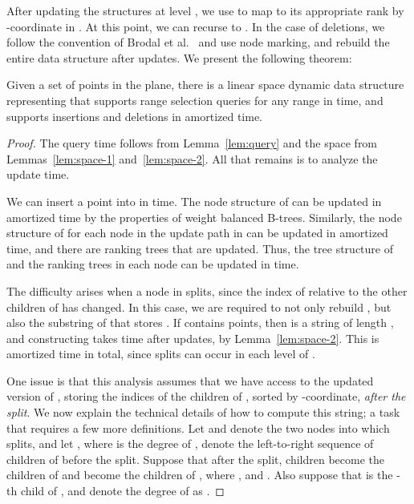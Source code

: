 \documentclass{llncs}
\begin{document}
After updating the structures at level , we use  to map
 to its appropriate rank by -coordinate in .  At this
point, we can recurse to .  In the case of deletions, we follow
the convention of Brodal et al.~\cite{BGJS10} and use node marking,
and rebuild the entire data structure after  updates.  We
present the following theorem:

\begin{theorem}\label{thm:main}
Given a set  of points in the plane, there is a linear space
dynamic data structure representing  that supports range selection
queries for any range  in  time,
and supports insertions and deletions in 
amortized time.
\end{theorem}


\begin{proof}
The query time follows from Lemma~\ref{lem:query} and the space from
Lemmas~\ref{lem:space-1} and~\ref{lem:space-2}. All that remains is to
analyze the update time.

We can insert a point  into  in  time.  The node
structure of  can be updated in  amortized
time by the properties of weight balanced B-trees.  Similarly, the
node structure of  for each node  in the update path in 
can be updated in  amortized time, and there
are  ranking trees that are updated.  Thus, the
tree structure of  and the ranking trees in each node can be
updated in  time.

The difficulty arises when a node  in  splits, since the index
of  relative to the other children of  has changed.  In this
case, we are required to not only rebuild , but also the
substring of  that stores .  If  contains 
points, then  is a string of length , and constructing  takes
 time after  updates, by
Lemma~\ref{lem:space-2}.  This is  amortized time in total, since splits can occur in each
level of .

One issue is that this analysis assumes that we have access to the
updated version of , storing the indices of the children of
, sorted by -coordinate, \emph{after the split}.  We now
explain the technical details of how to compute this string; a task
that requires a few more definitions. Let  and  denote the
two nodes into which  splits, and let , where  is the degree of , denote the
left-to-right sequence of children of  before the split.  Suppose
that after the split, children  become the children of
 and  become the children of , where , and .  Also suppose
that  is the -th child of , and denote the degree of 
as .


\end{proof}
\end{document}
